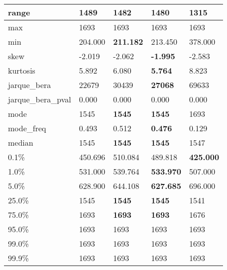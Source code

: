 \begin{table}[H]
\begin{tabular}{|l|m{10em}|m{10em}|m{10em}|m{10em}|}
\hline range & 1489 & \bfseries 1482 & 1480 & \cellcolor[rgb]{0.9, 0.54, 0.52} 1315 \\
\hline max & 1693 & 1693 & 1693 & 1693 \\
\hline min & 204.000 & \bfseries 211.182 & 213.450 & \cellcolor[rgb]{0.9, 0.54, 0.52} 378.000 \\
\hline skew & -2.019 & -2.062 & \bfseries -1.995 & \cellcolor[rgb]{0.9, 0.54, 0.52} -2.583 \\
\hline kurtosis & 5.892 & 6.080 & \bfseries 5.764 & \cellcolor[rgb]{0.9, 0.54, 0.52} 8.823 \\
\hline jarque\_bera & 22679 & 30439 & \bfseries 27068 & \cellcolor[rgb]{0.9, 0.54, 0.52} 69633 \\
\hline jarque\_bera\_pval & 0.000 & 0.000 & 0.000 & 0.000 \\
\hline mode & 1545 & \bfseries 1545 & \bfseries 1545 & \cellcolor[rgb]{0.9, 0.54, 0.52} 1693 \\
\hline mode\_freq & 0.493 & 0.512 & \bfseries 0.476 & \cellcolor[rgb]{0.9, 0.54, 0.52} 0.129 \\
\hline median & 1545 & \bfseries 1545 & \bfseries 1545 & \cellcolor[rgb]{0.9, 0.54, 0.52} 1547 \\
\hline 0.1\% & 450.696 & \cellcolor[rgb]{0.9, 0.54, 0.52} 510.084 & 489.818 & \bfseries 425.000 \\
\hline 1.0\% & 531.000 & 539.764 & \bfseries 533.970 & \cellcolor[rgb]{0.9, 0.54, 0.52} 507.000 \\
\hline 5.0\% & 628.900 & 644.108 & \bfseries 627.685 & \cellcolor[rgb]{0.9, 0.54, 0.52} 696.000 \\
\hline 25.0\% & 1545 & \bfseries 1545 & \bfseries 1545 & \cellcolor[rgb]{0.9, 0.54, 0.52} 1541 \\
\hline 75.0\% & 1693 & \bfseries 1693 & \bfseries 1693 & \cellcolor[rgb]{0.9, 0.54, 0.52} 1676 \\
\hline 95.0\% & 1693 & 1693 & 1693 & 1693 \\
\hline 99.0\% & 1693 & 1693 & 1693 & 1693 \\
\hline 99.9\% & 1693 & 1693 & 1693 & 1693 \\
\hline
\end{tabular}
\end{table}
